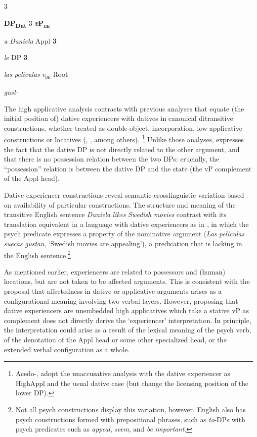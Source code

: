 \documentclass[output=paper,modfonts,nonflat]{langsci/langscibook}
\begin{document}
         \textsc{\textsubscript{} }   3 

    \textbf{DP\textsubscript{Dat}}          3   \textbf{\textit{v}}\textbf{P\textsc{\textsubscript{be}}}

    \textit{a} \textit{Daniela}       Appl       \textbf{3}  

                      \textit{le}         DP         \textbf{3}   

                     \textit{las} \textit{películas}    \textit{v}\textsc{\textsubscript{be}               }Root 

                      \textit{gust}{}-    

The high applicative analysis contrasts with previous analyses that equate (the initial position of) dative experiencers with datives in canonical ditransitive constructions, whether treated as double-object, incorporation, low applicative constructions or locatives (\citealt{BellettiRizzi1988}, \citealt{Masullo1992}, among others).\textsuperscript{} \footnote{Acedo-\citealt{MatellánMateu2015}, \citealt{Pujalte2015} adopt the unaccusative analysis with the dative experiencer as HighAppl and the usual dative case (but change the licensing position of the lower DP).}   Unlike those analyses,  expresses the fact that the dative DP is not directly related to the other argument, and that there is no possession relation between the two DPs: crucially, the “possession” relation is between the dative DP and the state (the vP complement of the Appl head). 

Dative experiencer constructions reveal semantic crosslinguistic variation based on availability of particular constructions. The structure and meaning of the transitive English sentence \textit{Daniela} \textit{likes} \textit{Swedish} \textit{movies} contrast with its translation equivalent in a language with dative experiencers as in , in which the psych predicate expresses a property of the nominative argument (\textit{Las} \textit{películas} \textit{suecas} \textit{gustan}, ‘Swedish movies are appealing’), a predication that is lacking in the English sentence.\footnote{Not all psych constructions display this variation, however. English also has psych constructions formed with prepositional phrases, such as \textit{to}{}-DPs with psych predicates such as \textit{appeal}, \textit{seem}, and \textit{be} \textit{important}.} 

As mentioned earlier, experiencers are related to possessors and (human) locations, but are not taken to be affected arguments. This is consistent with the proposal that affectedness in dative or applicative arguments arises as a configurational meaning involving two verbal layers. However, proposing that dative experiencers are unembedded high applicatives which take a stative vP as complement does not directly derive the ‘experiencer’ interpretation. In principle, the interpretation could arise as a result of the lexical meaning of the psych verb, of the denotation of the Appl head or some other specialized head, or the extended verbal configuration as a whole. 
\end{document}
